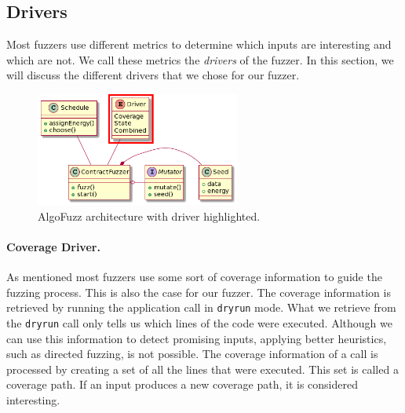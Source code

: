 \subsection*{Drivers}\label{section:drivers}
Most fuzzers use different metrics to determine which inputs are interesting and which are not.
We call these metrics the \textit{drivers} of the fuzzer.
In this section, we will discuss the different drivers that we chose for our fuzzer.


\begin{figure}[htbp]
    \centering
    \includegraphics[width=0.6\textwidth]{figures/architecture-driver-square.png}
    \caption{AlgoFuzz architecture with driver highlighted.}\label{fig:architecture-driver}
\end{figure}

\paragraph{Coverage Driver.}
As mentioned most fuzzers use some sort of coverage information to guide the fuzzing process.
This is also the case for our fuzzer.
The coverage information is retrieved by running the application call in \texttt{dryrun} mode.
What we retrieve from the \texttt{dryrun} call only tells us which lines of the code were executed.
Although we can use this information to detect promising inputs, applying better heuristics, such as directed fuzzing, is not possible.
The coverage information of a call is processed by creating a set of all the lines that were executed.
This set is called a coverage path.
If an input produces a new coverage path, it is considered interesting.

